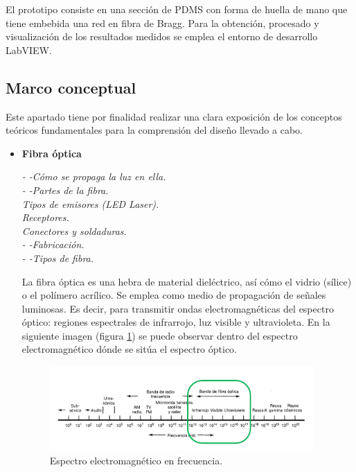  El prototipo consiste en una sección de PDMS con forma de huella de mano que tiene embebida una red en fibra de Bragg. Para la obtención, procesado y visualización de los resultados medidos se emplea el entorno de desarrollo LabVIEW.


\subsection{Marco conceptual}
\label{sec:mc3FBG}

Este apartado tiene por finalidad realizar una clara exposición de los conceptos teóricos fundamentales para la comprensión del diseño llevado a cabo. 

\begin{itemize}
	\item \textbf{Fibra óptica}
	
	\textcolor{rositaoscuro}{
		\textit{
			- -Cómo se propaga la luz en ella.\\
	 		- -Partes de la fibra.\\
			Tipos de emisores (LED Laser).\\
			Receptores.\\
			Conectores y soldaduras.\\
			- -Fabricación.\\
			- -Tipos de fibra.\\
		}
	}

	La fibra óptica es una hebra de material dieléctrico, así cómo el vidrio (sílice) o el polímero acrílico. 
	Se emplea como medio de propagación de señales luminosas. Es decir, para transmitir ondas electromagnéticas del espectro óptico: regiones espectrales de infrarrojo, luz visible y ultravioleta. En la siguiente imagen (figura \ref{fig:espectroOptico}) se puede observar dentro del espectro electromagnético dónde se sitúa el espectro óptico.	 
	
	\begin{figure}[H]
		\centering
		\includegraphics[width=0.95\textwidth]{./img/espectrooptico}
		\caption{Espectro electromagnético en frecuencia.}
		\label{fig:espectroOptico}
	\end{figure}
	

\end{itemize}
